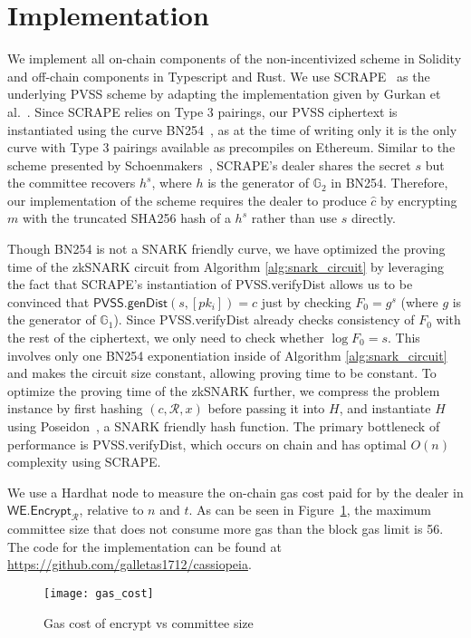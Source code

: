 \section{Implementation}

We implement all on-chain components of the non-incentivized scheme in Solidity and off-chain components in Typescript and Rust.
We use SCRAPE~\cite{pvss_scrape} as the underlying PVSS scheme by adapting the implementation given by Gurkan et al.~\cite{aggregatable_dkg}.
Since SCRAPE relies on Type 3 pairings, our PVSS ciphertext is instantiated using the curve BN254~\cite{bn254}, as at the time of writing only it is the only curve with Type 3 pairings available as precompiles on Ethereum.
Similar to the scheme presented by Schoenmakers~\cite{pvss_schoenmakers}, SCRAPE's dealer shares the secret $s$ but the committee recovers $h^s$, where $h$ is the generator of $\mathbb{G}_2$ in BN254.
Therefore, our implementation of the scheme requires the dealer to produce $\hat{c}$ by encrypting $m$ with the truncated SHA256 hash of a $h^s$ rather than use $s$ directly.

Though BN254 is not a SNARK friendly curve, we have optimized the proving time of the zkSNARK circuit from Algorithm \ref{alg:snark_circuit} by leveraging the fact that SCRAPE's instantiation of \textsf{PVSS.verifyDist} allows us to be convinced that $\textsf{PVSS.genDist}(s, [pk_i]) = c$ just by checking $F_0 = g^s$ (where $g$ is the generator of $\mathbb{G}_1$).
Since \textsf{PVSS.verifyDist} already checks consistency of $F_0$ with the rest of the ciphertext, we only need to check whether $\log F_0 = s$.
This involves only one BN254 exponentiation inside of Algorithm \ref{alg:snark_circuit} and makes the circuit size constant, allowing proving time to be constant.
To optimize the proving time of the zkSNARK further, we compress the problem instance by first hashing $(c, \mathcal{R}, x)$ before passing it into $H$, and instantiate $H$ using Poseidon~\cite{poseidon}, a SNARK friendly hash function.
The primary bottleneck of performance is \textsf{PVSS.verifyDist}, which occurs on chain and has optimal $O(n)$ complexity using SCRAPE.


We use a Hardhat node to measure the on-chain gas cost paid for by the dealer in $\textsf{WE.Encrypt}_\mathcal{R}$, relative to $n$ and $t$.
As can be seen in Figure~\ref{fig:gas_cost}, the maximum committee size that does not consume more gas than the block gas limit is 56. 
The code for the implementation can be found at \url{https://github.com/galletas1712/cassiopeia}.
\begin{figure}\label{fig:gas_cost}
\caption{Gas cost of \textsf{encrypt} vs committee size}
\texttt{[image: gas\_cost]}
\end{figure}


